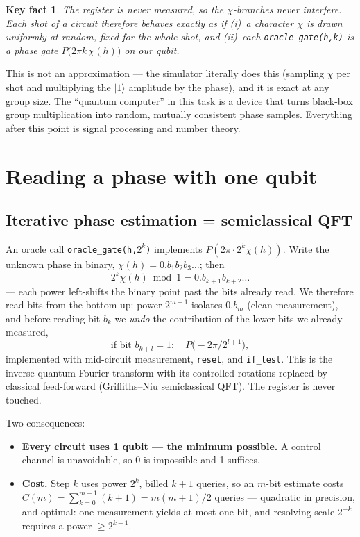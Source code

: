 \documentclass[11pt]{article}
\newcommand{\ket}[1]{\lvert #1 \rangle}
\theoremstyle{plain}
\newtheorem{fact}{Key fact}
\theoremstyle{definition}
\begin{document}
\begin{fact}
The register is never measured, so the $\chi$-branches never interfere.
Each shot of a circuit therefore behaves \emph{exactly} as if
(i)~a character $\chi$ is drawn uniformly at random, fixed for the whole
shot, and (ii)~each \texttt{oracle\_gate(h,k)} is a phase gate
$P\!\big(2\pi k\,\chi(h)\big)$ on our qubit.
\end{fact}

This is not an approximation --- the simulator literally does this
(sampling $\chi$ per shot and multiplying the $\ket1$ amplitude by the
phase), and it is exact at any group size. The ``quantum computer'' in
this task is a device that turns black-box group multiplication into
random, mutually consistent phase samples. Everything after this point is
signal processing and number theory.

\section{Reading a phase with one qubit}

\subsection{Iterative phase estimation = semiclassical QFT}

An oracle call \texttt{oracle\_gate(h,}$2^k$\texttt{)} implements
$P(2\pi\cdot 2^k\chi(h))$. Write the unknown phase in binary,
$\chi(h)=0.b_1b_2b_3\dots$; then
\[
  2^k\chi(h) \bmod 1 = 0.b_{k+1}b_{k+2}\dots
\]
--- each power left-shifts the binary point past the bits already read.
We therefore read bits from the bottom up: power $2^{m-1}$ isolates
$0.b_m$ (clean measurement), and before reading bit $b_k$ we \emph{undo}
the contribution of the lower bits we already measured,
\[
  \text{if bit } b_{k+l}=1:\quad P\!\big(-2\pi/2^{l+1}\big),
\]
implemented with mid-circuit measurement, \texttt{reset}, and
\texttt{if\_test}. This is the inverse quantum Fourier transform with its
controlled rotations replaced by classical feed-forward
(Griffiths--Niu semiclassical QFT). The register is never touched.

Two consequences:

\begin{itemize}[nosep]
  \item \textbf{Every circuit uses 1 qubit --- the minimum possible.}
        A control channel is unavoidable, so 0 is impossible and
        1 suffices.
  \item \textbf{Cost.} Step $k$ uses power $2^k$, billed $k+1$ queries,
        so an $m$-bit estimate costs
        $C(m)=\sum_{k=0}^{m-1}(k+1)=m(m+1)/2$ queries --- quadratic in
        precision, and optimal: one measurement yields at most one bit,
        and resolving scale $2^{-k}$ requires a power $\ge 2^{k-1}$.
\end{itemize}
\end{document}
